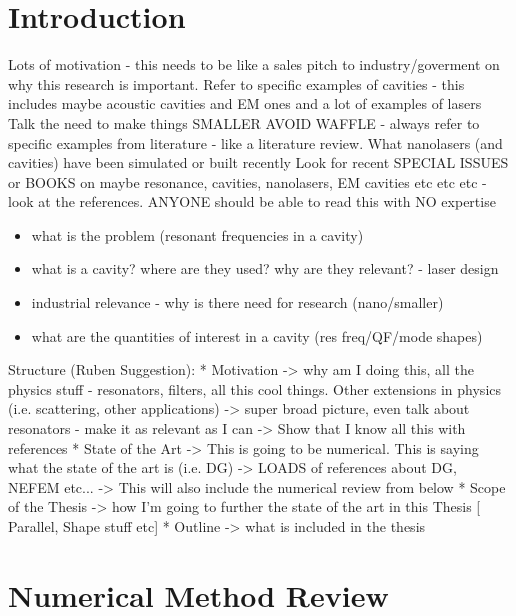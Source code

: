 \chapter{Introduction} %
\label{Chapter1}

Lots of motivation - this needs to be like a sales pitch to industry/goverment on why this research is important.
Refer to specific examples of cavities - this includes maybe acoustic cavities and EM ones and a lot of examples of lasers
Talk the need to make things SMALLER
AVOID WAFFLE - always refer to specific examples from literature - like a literature review.
What nanolasers (and cavities) have been simulated or built recently
Look for recent SPECIAL ISSUES or BOOKS on maybe resonance, cavities, nanolasers, EM cavities etc etc etc - look at the references.
ANYONE should be able to read this with NO expertise

\begin{itemize}
	\item what is the problem (resonant frequencies in a cavity)
	\item what is a cavity? where are they used? why are they relevant? - laser design
	\item industrial relevance - why is there need for research (nano/smaller)
  \item what are the quantities of interest in a cavity (res freq/QF/mode shapes)
\end{itemize}

Structure (Ruben Suggestion):
    * Motivation
       -> why am I doing this, all the physics stuff - resonators, filters, all
       this cool things. Other extensions in physics (i.e. scattering, other
       applications)
       -> super broad picture, even talk about resonators - make it as relevant
       as I can
       -> Show that I know all this with references
    * State of the Art
       -> This is going to be numerical. This is saying what the state of the
       art is (i.e. DG)
       -> LOADS of references about DG, NEFEM etc...
       -> This will also include the numerical review from below
    * Scope of the Thesis
       -> how I'm going to further the state of the art in this Thesis [ Parallel, Shape stuff etc]
    * Outline
       -> what is included in the thesis
  

\chapter{Numerical Method Review}
\label{NumericalMethodsChapter}

